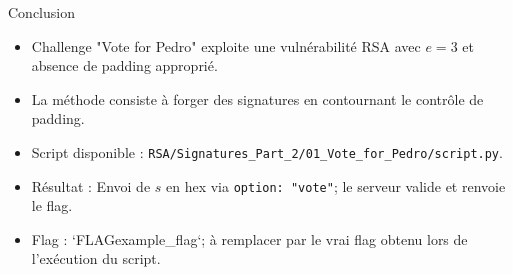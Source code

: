 \begin{frame}{Conclusion}
    \begin{itemize}
        \item Challenge "Vote for Pedro" exploite une vulnérabilité RSA avec $e=3$ et absence de padding approprié.
        \item La méthode consiste à forger des signatures en contournant le contrôle de padding.
        \item Script disponible : \texttt{RSA/Signatures\_Part\_2/01\_Vote\_for\_Pedro/script.py}.
        \item Résultat : Envoi de $s$ en hex via \texttt{option: "vote"}; le serveur valide et renvoie le flag.
        \item Flag : `FLAG{example_flag}`; à remplacer par le vrai flag obtenu lors de l'exécution du script.
    \end{itemize}
\end{frame}